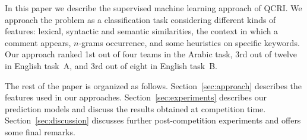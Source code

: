In this paper we describe the supervised machine learning approach of QCRI\@. 
We approach the problem as a classification task considering different kinds 
of features: lexical, syntactic and semantic similarities, the context in which 
a comment appears, $n$-grams occurrence, and some heuristics on specific 
keywords. Our approach ranked 1st out of four teams in the Arabic task, 3rd out 
of twelve in English task~A, and 3rd out of eight in English task~B. 

The rest of the paper is organized as follows. Section~\ref{sec:approach} 
describes the features used in our approaches. Section~\ref{sec:experiments} 
describes our prediction models and discuss the results obtained at competition 
time. Section~\ref{sec:discussion} discusses further post-competition 
experiments and offers some final remarks.